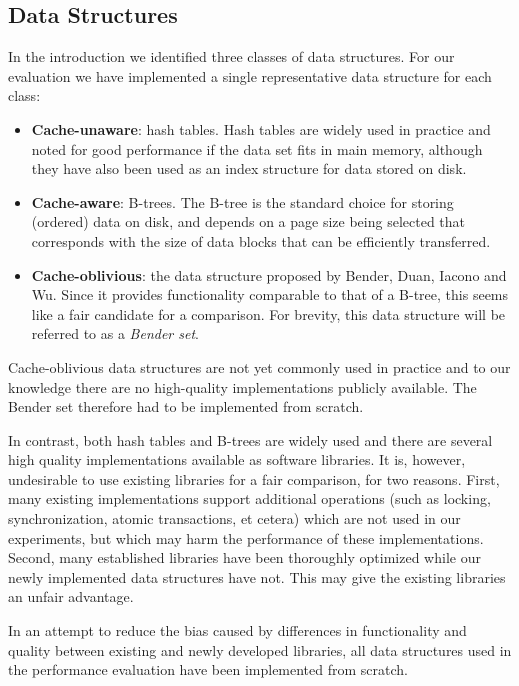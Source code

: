 \documentclass{acm_proc_article-sp}
\begin{document}
\subsection{Data Structures}
In the introduction we identified three classes of data structures.
For our evaluation we have implemented a single representative data structure
for each class:
\begin{itemize}
\item \textbf{Cache-unaware}: hash tables. Hash tables are widely used in practice and noted for good performance if the data set fits in main memory, although they have also been used as an index structure for data stored on disk.
\item \textbf{Cache-aware}: B-trees. The B-tree is the standard choice for
storing (ordered) data on disk, and depends on a page size being selected that
corresponds with the size of data blocks that can be efficiently transferred.
\item \textbf{Cache-oblivious}: the data structure proposed by Bender, Duan, Iacono and Wu. Since it provides functionality comparable to that of a B-tree, this seems like a fair candidate for a comparison. For brevity, this data structure will be referred to as a \emph{Bender set}.
\end{itemize}

Cache-oblivious data structures are not yet commonly used in practice and to
our knowledge there are no high-quality implementations publicly available.
The Bender set therefore had to be implemented from scratch.

In contrast, both hash tables and B-trees are widely used and there are several
high quality implementations available as software libraries. It is, however,
undesirable to use existing libraries for a fair comparison, for two reasons. First, many existing implementations support additional operations (such as locking, synchronization, atomic transactions, et cetera) which are not used in our experiments, but which may harm the performance of these implementations. Second, many established libraries have been thoroughly optimized while our newly implemented data structures have not. This may give the existing libraries an unfair advantage.

In an attempt to reduce the bias caused by differences in functionality and
quality between existing and newly developed libraries, all data structures
used in the performance evaluation have been implemented from scratch.
\end{document}
